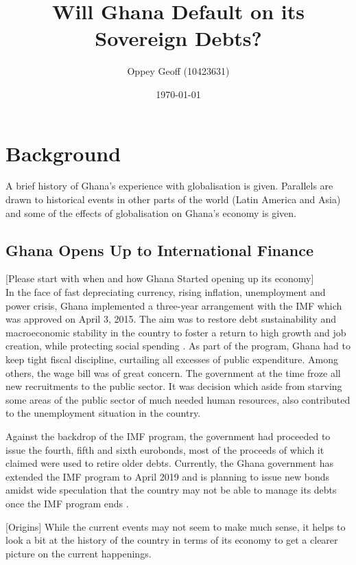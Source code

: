 \documentclass[a4paper, 12pt]{article}
\author{Oppey Geoff (10423631)}
\title{Will Ghana Default on its Sovereign Debts?}
\date{\today}
\begin{document}
	\maketitle
	\clearpage
	\tableofcontents
	\newpage
	\doublespacing

	\section{Background}
	A brief history of Ghana's experience with globalisation is given. Parallels are drawn to historical events in other parts of the world (Latin America and Asia) and some of the effects of globalisation on Ghana's economy is given.
	
	\subsection{Ghana Opens Up to International Finance}
	[Please start with when and how Ghana Started opening up its economy]\\
	In the face of fast depreciating currency, rising inflation, unemployment and power crisis, Ghana implemented a three-year arrangement with the IMF which was approved on April 3, 2015. The aim was to restore debt sustainability and macroeconomic stability in the country to foster a return to high growth and job creation, while protecting social spending \cite{IMF2018}. As part of the program, Ghana had to keep tight fiscal discipline, curtailing all excesses of public expenditure. Among others, the wage bill was of great concern. The government at the time froze all new recruitments to the public sector. It was decision which aside from starving some areas of the public sector of much needed human resources, also contributed to the unemployment situation in the country.
	
	Against the backdrop of the IMF program, the government had proceeded to issue the fourth, fifth and sixth eurobonds, most of the proceeds of which it claimed were used to retire older debts. Currently, the Ghana government has extended the IMF program to April 2019 and is planning to issue new bonds amidst wide speculation that the country may not be able to manage its debts once the IMF program ends \cite{Dontoh2019Jan}.
	
	[Origins]
	While the current events may not seem  to make much sense, it helps to look a bit at the history of the country in terms of its economy to get a clearer picture on the current happenings.
	
\end{document}
